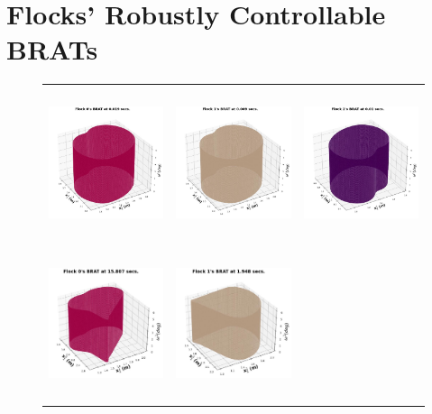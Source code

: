 \section{Flocks' Robustly Controllable BRATs}
\label{sec:rcbrats}

\begin{figure}[tb!]
	\centering
	\begin{tabular}{ccc} 
		\includegraphics[height=12em,width=10em]{figures/flock_0_init.jpg} 
		&
		\includegraphics[height=12em,width=10em]{figures/flock_1_init.jpg} 
		& 		
		\includegraphics[height=12em,width=10em]{figures/flock_2_init.jpg} 
		\\
		\includegraphics[height=12em,width=10em]{figures/flock_0_final.jpg} 
		&
		\includegraphics[height=12em,width=10em]{figures/flock_1_final.jpg} 

\end{tabular}
\end{figure}
